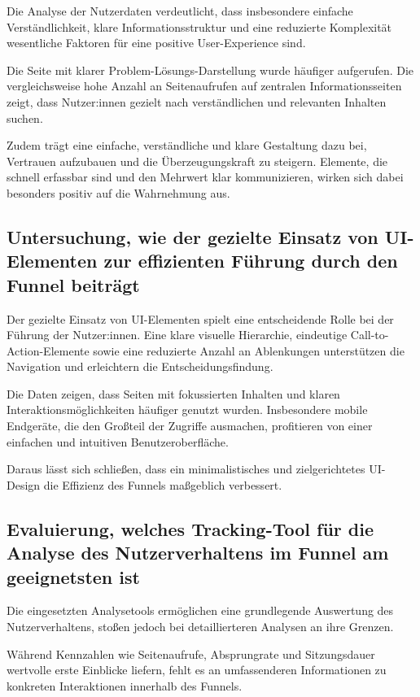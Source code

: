 Die Analyse der Nutzerdaten verdeutlicht, dass insbesondere 
einfache Verständlichkeit, klare Informationsstruktur und eine 
reduzierte Komplexität wesentliche Faktoren für eine positive 
User-Experience sind. 

Die Seite mit klarer Problem-Lösungs-Darstellung 
wurde häufiger aufgerufen. Die vergleichsweise hohe Anzahl 
an Seitenaufrufen auf zentralen Informationsseiten 
zeigt, dass Nutzer:innen gezielt nach verständlichen und 
relevanten Inhalten suchen.

Zudem trägt eine einfache, verständliche und klare Gestaltung dazu bei, 
Vertrauen aufzubauen und die Überzeugungskraft zu steigern. 
Elemente, die schnell erfassbar sind und den Mehrwert klar 
kommunizieren, wirken sich dabei besonders positiv auf die 
Wahrnehmung aus.

\subsection{Untersuchung, wie der gezielte Einsatz von 
UI-Elementen zur effizienten Führung durch den Funnel beiträgt}

Der gezielte Einsatz von UI-Elementen spielt eine 
entscheidende Rolle bei der Führung der Nutzer:innen. 
Eine klare visuelle Hierarchie, eindeutige 
Call-to-Action-Elemente sowie eine reduzierte Anzahl an 
Ablenkungen unterstützen die Navigation und erleichtern die 
Entscheidungsfindung. 

Die Daten zeigen, dass Seiten mit fokussierten Inhalten und 
klaren Interaktionsmöglichkeiten häufiger genutzt wurden. 
Insbesondere mobile Endgeräte, die den Großteil der Zugriffe 
ausmachen, profitieren von einer einfachen und intuitiven 
Benutzeroberfläche. 

Daraus lässt sich schließen, dass ein minimalistisches und 
zielgerichtetes UI-Design die Effizienz des Funnels maßgeblich 
verbessert.

\subsection{Evaluierung, welches Tracking-Tool für die Analyse 
des Nutzerverhaltens im Funnel am geeignetsten ist}

Die eingesetzten Analysetools ermöglichen eine 
grundlegende Auswertung des Nutzerverhaltens, stoßen jedoch bei 
detaillierteren Analysen an ihre Grenzen. 

Während Kennzahlen wie Seitenaufrufe, Absprungrate und Sitzungsdauer 
wertvolle erste Einblicke liefern, fehlt es an 
umfassenderen Informationen zu konkreten Interaktionen innerhalb 
des Funnels. 

